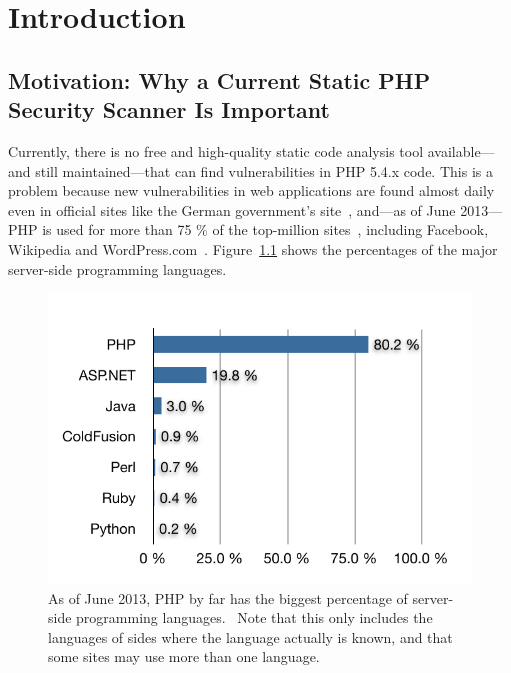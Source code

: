 \chapter{Introduction}

\section{Motivation: Why a Current Static PHP Security Scanner Is Important}
Currently, there is no free and high-quality static code analysis tool available---and still maintained---that can find vulnerabilities in PHP 5.4.x code. This is a problem because new vulnerabilities in web applications are found almost daily~\cite{osvdb} even in official sites like the German government's site~\cite{xss-bundesregierung}, and---as of June 2013---PHP is used for more than 75 \% of the top-million sites~\cite{w3techs-php-usage}, including Facebook, Wikipedia and WordPress.com~\cite{w3techs-php-sites}. Figure~\ref{fig:php-percentage} shows the percentages of the major server-side programming languages.

\begin{figure}[htb]
  \begin{center}
    \includegraphics[scale=1.0]{images/language-percentage}
    \caption{As of June 2013, PHP by far has the biggest percentage of server-side programming languages.~\cite{w3techs-php-usage} Note that this only includes the languages of sides where the language actually is known, and that some sites may use more than one language.}
    \label{fig:php-percentage}
  \end{center}
\end{figure}


